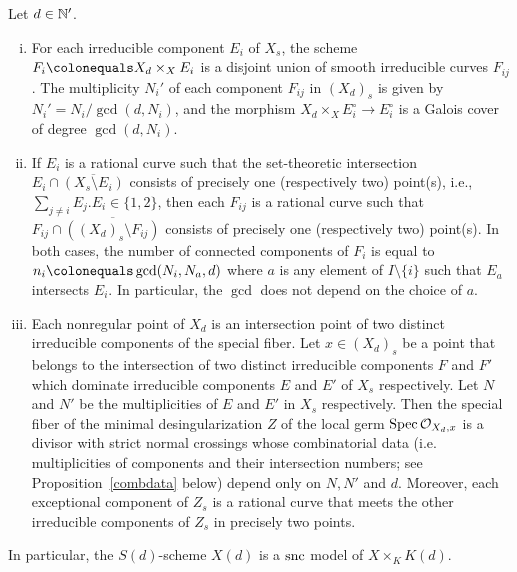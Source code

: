 \begin{prop}\label{comodel}\cite[Chapter~3, Proposition~1.3.2]{halnic}
Let $d \in \mathbb N'$.
\begin{enumerate}[(i)]
 \item For each irreducible component $E_i$ of $X_s$, the scheme $F_i \colonequals X_d \times_X E_i$ is a disjoint union of smooth irreducible curves $F_{ij}$. The multiplicity $N_i'$ of each component $F_{ij}$ in $(X_d)_s$ is given by $N_i' = N_i/\gcd(d,N_i)$, and the morphism $X_d \times_X E_i^\circ \rightarrow E_i^\circ$ is a Galois cover of degree $\gcd(d,N_i)$.
 \item If $E_i$ is a rational curve such that the set-theoretic intersection $E_i \cap \overline{(X_s \setminus E_i)}$ consists of precisely one (respectively two) point(s), i.e., $\sum_{j \neq i} E_j.E_i \in \{1,2\}$, then each $F_{ij}$ is a rational curve such that $F_{ij} \cap \overline{((X_d)_s \setminus F_{ij})}$ consists of precisely one (respectively two) point(s). In both cases, the number of connected components of $F_i$ is equal to $n_i \colonequals \gcd(N_i,N_a,d)$ where $a$ is any element of $I \setminus \{i\}$ such that $E_a$ intersects $E_i$. In particular, the $\gcd$ does not depend on the choice of $a$.
 \item Each nonregular point of $X_d$ is an intersection point of two distinct irreducible components of the special fiber. Let $x \in (X_d)_s$ be a point that belongs to the intersection of two distinct irreducible components $F$ and $F'$ which dominate irreducible components $E$ and $E'$ of $X_s$ respectively. Let $N$ and $N'$ be the multiplicities of $E$ and $E'$ in $X_s$ respectively. Then the special fiber of the minimal desingularization $Z$ of the local germ $\operatorname{Spec} \mathcal{O}_{X_d,x}$ is a divisor with strict normal crossings whose combinatorial data (i.e. multiplicities of components and their intersection numbers; see Proposition~\ref{combdata} below) depend only on $N,N'$ and $d$. Moreover, each exceptional component of $Z_s$ is a rational curve that meets the other irreducible components of $Z_s$ in precisely two points.
\end{enumerate}
In particular, the $S(d)$-scheme $X(d)$ is a $\textup{snc}$ model of $X \times_K K(d)$.  
\end{prop}

